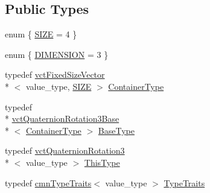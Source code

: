 \subsection*{Public Types}
\begin{DoxyCompactItemize}
\item 
enum \{ \hyperlink{classvct_quaternion_rotation3_af79c9874c4f1376d8f3fa7b15f140ff3afdd3977ff1d88ceaba530cfcdcc661b7}{S\-I\-Z\-E} = 4
 \}
\item 
enum \{ \hyperlink{classvct_quaternion_rotation3_ae952bd5b245e3d6f3740fa115776e90ea0793f2e11223485735287937bd52b876}{D\-I\-M\-E\-N\-S\-I\-O\-N} = 3
 \}
\item 
typedef \hyperlink{classvct_fixed_size_vector}{vct\-Fixed\-Size\-Vector}\\*
$<$ value\-\_\-type, \hyperlink{classvct_quaternion_rotation3_af79c9874c4f1376d8f3fa7b15f140ff3afdd3977ff1d88ceaba530cfcdcc661b7}{S\-I\-Z\-E} $>$ \hyperlink{classvct_quaternion_rotation3_a73c9511393f9a59206e3ca57c3564454}{Container\-Type}
\item 
typedef \\*
\hyperlink{classvct_quaternion_rotation3_base}{vct\-Quaternion\-Rotation3\-Base}\\*
$<$ \hyperlink{classvct_quaternion_rotation3_a73c9511393f9a59206e3ca57c3564454}{Container\-Type} $>$ \hyperlink{classvct_quaternion_rotation3_aaeef12df3c8d36659b11c3c8df04905f}{Base\-Type}
\item 
typedef \hyperlink{classvct_quaternion_rotation3}{vct\-Quaternion\-Rotation3}\\*
$<$ value\-\_\-type $>$ \hyperlink{classvct_quaternion_rotation3_a8150de55a15eb3adfc8f59a8815ddc70}{This\-Type}
\item 
typedef \hyperlink{classcmn_type_traits}{cmn\-Type\-Traits}$<$ value\-\_\-type $>$ \hyperlink{classvct_quaternion_rotation3_aa51626a8a27b17262aaabb133ac868e9}{Type\-Traits}
\end{DoxyCompactItemize}
